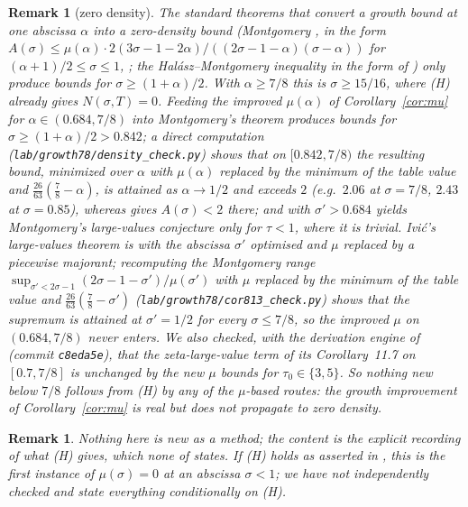 \documentclass[11pt]{article}
\newtheorem{remark}[theorem]{Remark}
\begin{document}
\begin{remark}[zero density]
The standard theorems that convert a growth bound at one abscissa $\alpha$ into a zero-density bound (Montgomery \cite[Thm.~12.3]{Mon71}, in the form $A(\sigma)\le\mu(\alpha)\cdot2(3\sigma-1-2\alpha)/((2\sigma-1-\alpha)(\sigma-\alpha))$ for $(\alpha+1)/2\le\sigma\le1$, \cite[Lemma~11.27]{ANTEDB}; the Hal\'asz--Montgomery inequality in the form of \cite[Cor.~8.13]{ANTEDB}) only produce bounds for $\sigma\ge(1+\alpha)/2$. With $\alpha\ge7/8$ this is $\sigma\ge15/16$, where (H) already gives $N(\sigma,T)=0$. Feeding the improved $\mu(\alpha)$ of Corollary~\ref{cor:mu} for $\alpha\in(0.684,7/8)$ into Montgomery's theorem produces bounds for $\sigma\ge(1+\alpha)/2>0.842$; a direct computation (\texttt{lab/growth78/density\_check.py}) shows that on $[0.842,7/8)$ the resulting bound, minimized over $\alpha$ with $\mu(\alpha)$ replaced by the minimum of the table value and $\tfrac{26}{63}(\tfrac78-\alpha)$, is attained as $\alpha\to1/2$ and exceeds $2$ (e.g.\ $2.06$ at $\sigma=7/8$, $2.43$ at $\sigma=0.85$), whereas \cite[Table~11.1]{ANTEDB} gives $A(\sigma)<2$ there; and \cite[Cor.~8.13]{ANTEDB} with $\sigma'>0.684$ yields Montgomery's large-values conjecture only for $\tau<1$, where it is trivial. Ivi\'c's large-values theorem \cite[Thm.~8.15]{ANTEDB} is \cite[Cor.~8.13]{ANTEDB} with the abscissa $\sigma'$ optimised and $\mu$ replaced by a piecewise majorant; recomputing the Montgomery range $\sup_{\sigma'<2\sigma-1}(2\sigma-1-\sigma')/\mu(\sigma')$ with $\mu$ replaced by the minimum of the table value and $\tfrac{26}{63}(\tfrac78-\sigma')$ (\texttt{lab/growth78/cor813\_check.py}) shows that the supremum is attained at $\sigma'=1/2$ for every $\sigma\le7/8$, so the improved $\mu$ on $(0.684,7/8)$ never enters. We also checked, with the derivation engine of \cite{ANTEDB} (commit \texttt{c8eda5e}), that the zeta-large-value term of its Corollary~11.7 on $[0.7,7/8]$ is unchanged by the new $\mu$ bounds for $\tau_0\in\{3,5\}$. So nothing new below $7/8$ follows from (H) by any of the $\mu$-based routes: the growth improvement of Corollary~\ref{cor:mu} is real but does not propagate to zero density.
\end{remark}

\begin{remark}
Nothing here is new as a method; the content is the explicit recording of what (H) gives, which none of \cite{Ope26,Liu26,Liu26b,XS26,Banks26,LiLiu26} states. If (H) holds as asserted in \cite{Ope26,Ope26lean}, this is the first instance of $\mu(\sigma)=0$ at an abscissa $\sigma<1$; we have not independently checked \cite{Ope26} and state everything conditionally on (H).
\end{remark}
\end{document}
